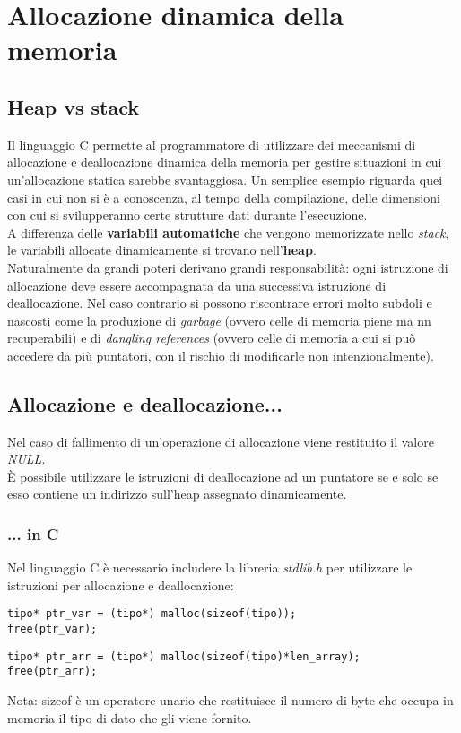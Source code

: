 \chapter{Allocazione dinamica della memoria}\label{memoriaDin}
\section{Heap vs stack}
Il linguaggio C permette al programmatore di utilizzare dei meccanismi di allocazione e deallocazione dinamica della memoria per gestire situazioni in cui un’allocazione statica sarebbe svantaggiosa. Un semplice esempio riguarda quei casi in cui non si è a conoscenza, al tempo della compilazione, delle dimensioni con cui si svilupperanno certe strutture dati durante l'esecuzione.\\
A differenza delle \textbf{variabili automatiche} che vengono memorizzate nello \textit{stack}, le variabili allocate dinamicamente si trovano nell'\textbf{heap}.\\
Naturalmente da grandi poteri derivano grandi responsabilità: ogni istruzione di allocazione deve essere accompagnata da una successiva istruzione di deallocazione. Nel caso contrario si possono riscontrare errori molto subdoli e nascosti come la produzione di \textit{garbage} (ovvero celle di memoria piene ma nn recuperabili) e di \textit{dangling references} (ovvero celle di memoria a cui si può accedere da più puntatori, con il rischio di modificarle non intenzionalmente).

\section{Allocazione e deallocazione...}
Nel caso di fallimento di un'operazione di allocazione viene restituito il valore \textit{NULL}.\\
\`{E} possibile utilizzare le istruzioni di deallocazione ad un puntatore se e solo se esso contiene un indirizzo sull'heap assegnato dinamicamente.
\subsection{... in C}
Nel linguaggio C è necessario includere la libreria \textit{stdlib.h} per utilizzare le istruzioni per allocazione e deallocazione:
\begin{lstlisting}[title={Allocazione e deallocazione dinamica di una variabile in C}]
tipo* ptr_var = (tipo*) malloc(sizeof(tipo));
free(ptr_var);
\end{lstlisting}
\begin{lstlisting}[title={Allocazione e deallocazione dinamica di un vettore in C}]
tipo* ptr_arr = (tipo*) malloc(sizeof(tipo)*len_array);
free(ptr_arr);
\end{lstlisting}
Nota: \colorbox{light-gray}{sizeof} è un operatore unario che restituisce il numero di byte che occupa in memoria il tipo di dato che gli viene fornito.

